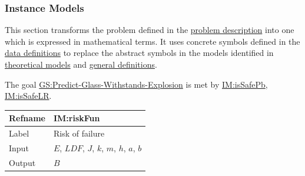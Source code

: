 \documentclass[12pt]{article}
\begin{document}
\subsubsection{Instance Models}
\label{Sec:IMs}
This section transforms the problem defined in the \hyperref[Sec:ProbDesc]{problem description} into one which is expressed in mathematical terms. It uses concrete symbols defined in the \hyperref[Sec:DDs]{data definitions} to replace the abstract symbols in the models identified in \hyperref[Sec:TMs]{theoretical models} and \hyperref[Sec:GDs]{general definitions}.

The goal \hyperref[willBreakGS]{GS:Predict-Glass-Withstands-Explosion} is met by \hyperref[IM:isSafePb]{IM:isSafePb}, \hyperref[IM:isSafeLR]{IM:isSafeLR}.

\medskip
\noindent
\begin{minipage}{\textwidth}
\begin{tabular}{>{\raggedright}p{}>{\raggedright\arraybackslash}p{}}
\toprule \textbf{Refname} & \textbf{IM:riskFun}
\label{IM:riskFun}
\\ \midrule
Label & Risk of failure
        
\\ \midrule
Input & $E$, $\mathit{LDF}$, $J$, $k$, $m$, $h$, $a$, $b$
        
\\ \midrule
Output & $B$
         

\end{tabular}
\end{minipage}
\end{document}
